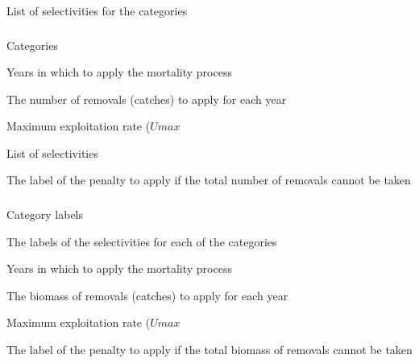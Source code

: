  {List of selectivities for the categories}

\subsubsection[Mortality Event]{}

 {Categories}

 {Years in which to apply the mortality process}

 {The number of removals (catches) to apply for each year}

 {Maximum exploitation rate ($Umax$}

 {List of selectivities}

 {The label of the penalty to apply if the total number of removals cannot be taken}

\subsubsection[Mortality Event Biomass]{}

 {Category labels}

 {The labels of the selectivities for each of the categories}

 {Years in which to apply the mortality process}

 {The biomass of removals (catches) to apply for each year}

 {Maximum exploitation rate ($Umax$}

 {The label of the penalty to apply if the total biomass of removals cannot be taken}

\subsubsection[Mortality Holling Rate]{}


